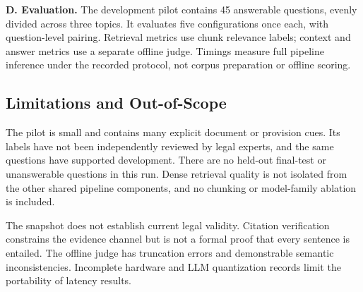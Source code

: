 \textbf{D. Evaluation.} The development pilot contains 45 answerable questions, evenly divided across three topics. It evaluates five configurations once each, with question-level pairing. Retrieval metrics use chunk relevance labels; context and answer metrics use a separate offline judge. Timings measure full pipeline inference under the recorded protocol, not corpus preparation or offline scoring.

\subsection{Limitations and Out-of-Scope}
The pilot is small and contains many explicit document or provision cues. Its labels have not been independently reviewed by legal experts, and the same questions have supported development. There are no held-out final-test or unanswerable questions in this run. Dense retrieval quality is not isolated from the other shared pipeline components, and no chunking or model-family ablation is included.

The snapshot does not establish current legal validity. Citation verification constrains the evidence channel but is not a formal proof that every sentence is entailed. The offline judge has truncation errors and demonstrable semantic inconsistencies. Incomplete hardware and LLM quantization records limit the portability of latency results.
